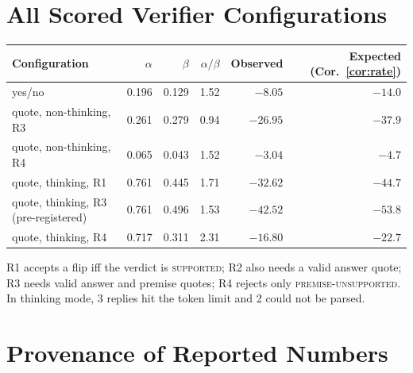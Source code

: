 \documentclass[10pt]{article}
\theoremstyle{plain}
\theoremstyle{definition}
\begin{document}
\section{All Scored Verifier Configurations}
\label{app:verifiers}

\begin{center}
\small
\begin{tabular}{lrrrrr}
\toprule
Configuration & $\alpha$ & $\beta$ & $\alpha/\beta$ & Observed & Expected (Cor.~\ref{cor:rate}) \\
\midrule
yes/no & 0.196 & 0.129 & 1.52 & $-8.05$ & $-14.0$ \\
quote, non-thinking, R3 & 0.261 & 0.279 & 0.94 & $-26.95$ & $-37.9$ \\
quote, non-thinking, R4 & 0.065 & 0.043 & 1.52 & $-3.04$ & $-4.7$ \\
quote, thinking, R1 & 0.761 & 0.445 & 1.71 & $-32.62$ & $-44.7$ \\
quote, thinking, R3 (pre-registered) & 0.761 & 0.496 & 1.53 & $-42.52$ & $-53.8$ \\
quote, thinking, R4 & 0.717 & 0.311 & 2.31 & $-16.80$ & $-22.7$ \\
\bottomrule
\end{tabular}
\end{center}
R1 accepts a flip iff the verdict is \textsc{supported}; R2 also needs a valid answer quote; R3 needs
valid answer and premise quotes; R4 rejects only \textsc{premise-unsupported}. In thinking mode, 3 replies
hit the token limit and 2 could not be parsed.

\section{Provenance of Reported Numbers}
\label{app:provenance}
\end{document}
